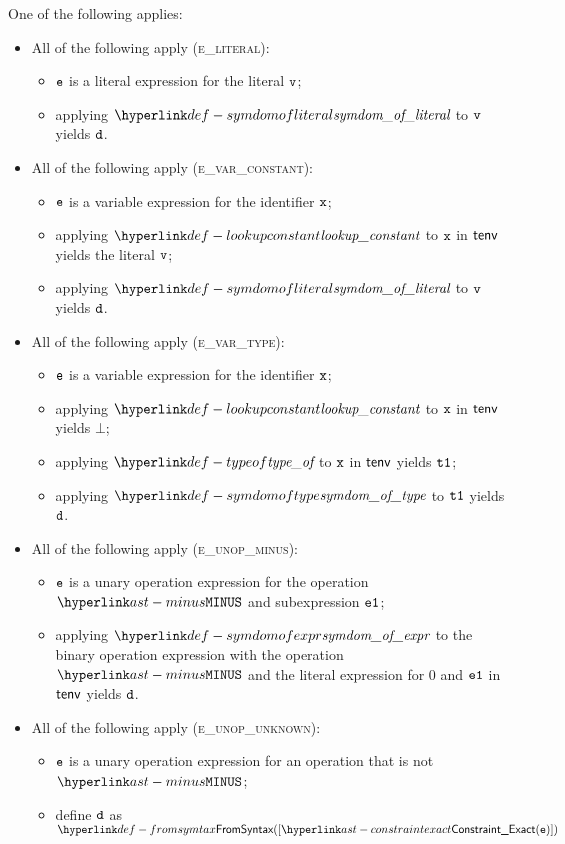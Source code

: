 \ProseParagraph
One of the following applies:
\begin{itemize}
  \item All of the following apply (\textsc{e\_literal}):
  \begin{itemize}
    \item $\texttt{e}$ is a literal expression for the literal $\texttt{v}$;
    \item applying $\symdomofliteral$ to $\texttt{v}$ yields $\texttt{d}$.
  \end{itemize}

  \item All of the following apply (\textsc{e\_var\_constant}):
  \begin{itemize}
    \item $\texttt{e}$ is a variable expression for the identifier $\texttt{x}$;
    \item applying $\lookupconstant$ to $\texttt{x}$ in $\textsf{tenv}$ yields the literal $\texttt{v}$;
    \item applying $\symdomofliteral$ to $\texttt{v}$ yields $\texttt{d}$.
  \end{itemize}

  \item All of the following apply (\textsc{e\_var\_type}):
  \begin{itemize}
    \item $\texttt{e}$ is a variable expression for the identifier $\texttt{x}$;
    \item applying $\lookupconstant$ to $\texttt{x}$ in $\textsf{tenv}$ yields $\bot$;
    \item applying $\typeof$ to $\texttt{x}$ in $\textsf{tenv}$ yields $\texttt{t1}$;
    \item applying $\symdomoftype$ to $\texttt{t1}$ yields $\texttt{d}$.
  \end{itemize}

  \item All of the following apply (\textsc{e\_unop\_minus}):
  \begin{itemize}
    \item $\texttt{e}$ is a unary operation expression for the operation $\MINUS$ and subexpression $\texttt{e1}$;
    \item applying $\symdomofexpr$ to the binary operation expression with the operation $\MINUS$
          and the literal expression for $0$ and $\texttt{e1}$ in $\textsf{tenv}$ yields $\texttt{d}$.
  \end{itemize}

  \item All of the following apply (\textsc{e\_unop\_unknown}):
  \begin{itemize}
    \item $\texttt{e}$ is a unary operation expression for an operation that is not $\MINUS$;
    \item define $\texttt{d}$ as $\FromSyntax([\ConstraintExact(\ve)])$
  \end{itemize}


\end{itemize}
